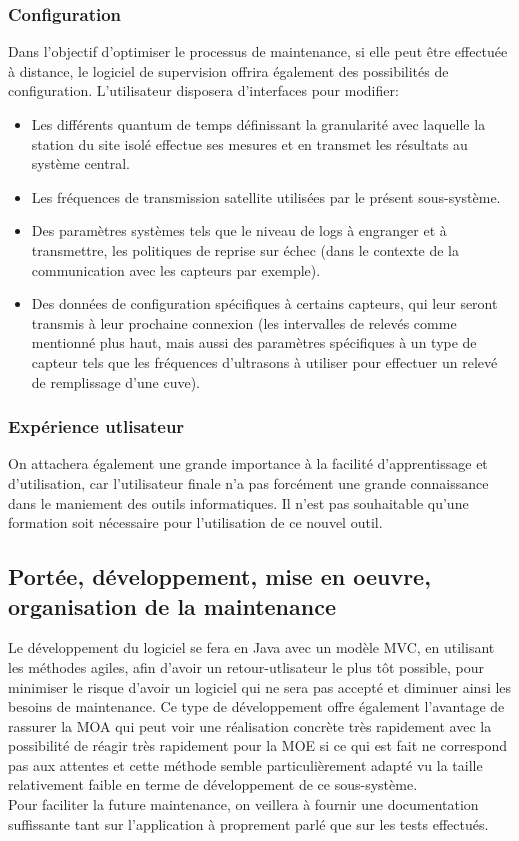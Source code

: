 \subsubsection{Configuration}
Dans l'objectif d'optimiser le processus de maintenance, si elle peut être effectuée à distance, le logiciel de supervision offrira également des possibilités de configuration.
L'utilisateur disposera d'interfaces pour modifier:
\begin{itemize}
	\item Les différents quantum de temps définissant la granularité avec laquelle la station du site isolé effectue ses mesures et en transmet les résultats au système central.
	\item Les fréquences de transmission satellite utilisées par le présent sous-système.
	\item Des paramètres systèmes tels que le niveau de logs à engranger et à transmettre, les politiques de reprise sur échec (dans le contexte de la communication avec les capteurs par exemple).
	\item Des données de configuration spécifiques à certains capteurs, qui leur seront transmis à leur prochaine connexion (les intervalles de relevés comme mentionné plus haut, mais aussi des paramètres spécifiques à un type de capteur tels que les fréquences d'ultrasons à utiliser pour effectuer un relevé de remplissage d'une cuve).
\end{itemize}

\subsubsection{Expérience utlisateur}
On attachera également une grande importance à la facilité d'apprentissage et d'utilisation, car l'utilisateur finale n'a pas forcément une grande connaissance dans le maniement des outils informatiques. Il n'est pas souhaitable qu'une formation soit nécessaire pour l'utilisation de ce nouvel outil.

\subsection{Portée, développement, mise en oeuvre, organisation de la maintenance}
Le développement du logiciel se fera en Java avec un modèle MVC, en utilisant les méthodes agiles, afin d'avoir un retour-utlisateur le plus tôt possible, pour minimiser le risque d'avoir un logiciel qui ne sera pas accepté et diminuer ainsi les besoins de maintenance. Ce type de développement offre également l'avantage de rassurer la MOA qui peut voir une réalisation concrète très rapidement avec la possibilité de réagir très rapidement pour la MOE si ce qui est fait ne correspond pas aux attentes et cette méthode semble particulièrement adapté vu la taille relativement faible en terme de développement de ce sous-système.\\
Pour faciliter la future maintenance, on veillera à fournir une documentation suffissante tant sur l'application à proprement parlé que sur les tests effectués.

